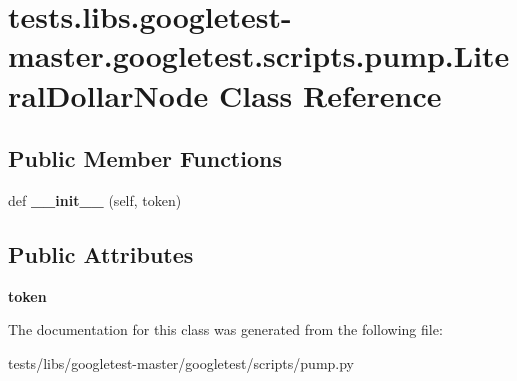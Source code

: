 \hypertarget{classtests_1_1libs_1_1googletest-master_1_1googletest_1_1scripts_1_1pump_1_1LiteralDollarNode}{}\section{tests.\+libs.\+googletest-\/master.googletest.\+scripts.\+pump.\+Literal\+Dollar\+Node Class Reference}
\label{classtests_1_1libs_1_1googletest-master_1_1googletest_1_1scripts_1_1pump_1_1LiteralDollarNode}
\subsection*{Public Member Functions}
\begin{DoxyCompactItemize}
\item 
\mbox{\label{classtests_1_1libs_1_1googletest-master_1_1googletest_1_1scripts_1_1pump_1_1LiteralDollarNode_a2bf2af24594286ef3e37e94cc7bbd551}} 
def {\bfseries \+\_\+\+\_\+init\+\_\+\+\_\+} (self, token)
\end{DoxyCompactItemize}
\subsection*{Public Attributes}
\begin{DoxyCompactItemize}
\item 
\mbox{\label{classtests_1_1libs_1_1googletest-master_1_1googletest_1_1scripts_1_1pump_1_1LiteralDollarNode_a5eb393692c2c9f9996a61d2af20d49eb}} 
{\bfseries token}
\end{DoxyCompactItemize}


The documentation for this class was generated from the following file\+:\begin{DoxyCompactItemize}
\item 
tests/libs/googletest-\/master/googletest/scripts/pump.\+py\end{DoxyCompactItemize}
